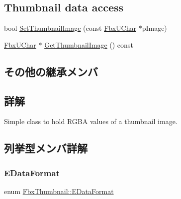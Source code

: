 \subsection*{Thumbnail data access}
\begin{DoxyCompactItemize}
\item 
bool \hyperlink{class_fbx_thumbnail_a44c5615f4a4428a158787f3cd4e02997}{Set\+Thumbnail\+Image} (const \hyperlink{fbxtypes_8h_a1be3cadf61e76f49142eb83e66ffe8bd}{Fbx\+U\+Char} $\ast$p\+Image)
\item 
\hyperlink{fbxtypes_8h_a1be3cadf61e76f49142eb83e66ffe8bd}{Fbx\+U\+Char} $\ast$ \hyperlink{class_fbx_thumbnail_aade1213f9f4322aca855cd24de720c14}{Get\+Thumbnail\+Image} () const
\end{DoxyCompactItemize}
\subsection*{その他の継承メンバ}


\subsection{詳解}
Simple class to hold R\+G\+BA values of a thumbnail image. 

\subsection{列挙型メンバ詳解}
\mbox{\label{class_fbx_thumbnail_a60bdaa7e6f78e26f4a8810c552958a0a}} 
\subsubsection{\texorpdfstring{E\+Data\+Format}{EDataFormat}}
{\footnotesize\ttfamily enum \hyperlink{class_fbx_thumbnail_a60bdaa7e6f78e26f4a8810c552958a0a}{Fbx\+Thumbnail\+::\+E\+Data\+Format}}

